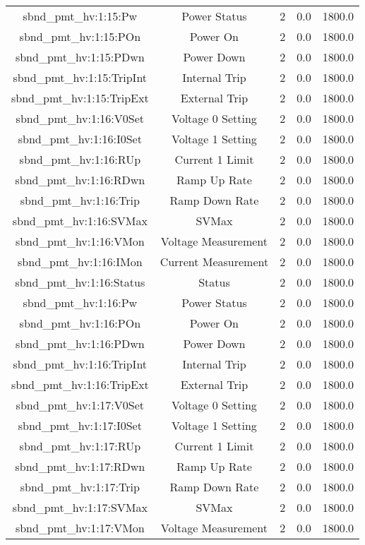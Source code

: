 \begin{center}
\begin{longtable}{c | c c c c }
sbnd\_pmt\_hv:1:15:Pw & Power Status & 2 & 0.0 & 1800.0\\ 
sbnd\_pmt\_hv:1:15:POn & Power On & 2 & 0.0 & 1800.0\\ 
sbnd\_pmt\_hv:1:15:PDwn & Power Down & 2 & 0.0 & 1800.0\\ 
sbnd\_pmt\_hv:1:15:TripInt & Internal Trip & 2 & 0.0 & 1800.0\\ 
sbnd\_pmt\_hv:1:15:TripExt & External Trip & 2 & 0.0 & 1800.0\\ 
sbnd\_pmt\_hv:1:16:V0Set & Voltage 0 Setting & 2 & 0.0 & 1800.0\\ 
sbnd\_pmt\_hv:1:16:I0Set & Voltage 1 Setting & 2 & 0.0 & 1800.0\\ 
sbnd\_pmt\_hv:1:16:RUp & Current 1 Limit & 2 & 0.0 & 1800.0\\ 
sbnd\_pmt\_hv:1:16:RDwn & Ramp Up Rate & 2 & 0.0 & 1800.0\\ 
sbnd\_pmt\_hv:1:16:Trip & Ramp Down Rate & 2 & 0.0 & 1800.0\\ 
sbnd\_pmt\_hv:1:16:SVMax & SVMax & 2 & 0.0 & 1800.0\\ 
sbnd\_pmt\_hv:1:16:VMon & Voltage Measurement & 2 & 0.0 & 1800.0\\ 
sbnd\_pmt\_hv:1:16:IMon & Current Measurement & 2 & 0.0 & 1800.0\\ 
sbnd\_pmt\_hv:1:16:Status & Status & 2 & 0.0 & 1800.0\\ 
sbnd\_pmt\_hv:1:16:Pw & Power Status & 2 & 0.0 & 1800.0\\ 
sbnd\_pmt\_hv:1:16:POn & Power On & 2 & 0.0 & 1800.0\\ 
sbnd\_pmt\_hv:1:16:PDwn & Power Down & 2 & 0.0 & 1800.0\\ 
sbnd\_pmt\_hv:1:16:TripInt & Internal Trip & 2 & 0.0 & 1800.0\\ 
sbnd\_pmt\_hv:1:16:TripExt & External Trip & 2 & 0.0 & 1800.0\\ 
sbnd\_pmt\_hv:1:17:V0Set & Voltage 0 Setting & 2 & 0.0 & 1800.0\\ 
sbnd\_pmt\_hv:1:17:I0Set & Voltage 1 Setting & 2 & 0.0 & 1800.0\\ 
sbnd\_pmt\_hv:1:17:RUp & Current 1 Limit & 2 & 0.0 & 1800.0\\ 
sbnd\_pmt\_hv:1:17:RDwn & Ramp Up Rate & 2 & 0.0 & 1800.0\\ 
sbnd\_pmt\_hv:1:17:Trip & Ramp Down Rate & 2 & 0.0 & 1800.0\\ 
sbnd\_pmt\_hv:1:17:SVMax & SVMax & 2 & 0.0 & 1800.0\\ 
sbnd\_pmt\_hv:1:17:VMon & Voltage Measurement & 2 & 0.0 & 1800.0\\ 

\end{longtable}
\end{center}
